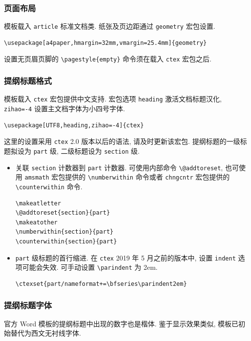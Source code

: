 \documentclass{article}
\begin{document}
\subsubsection{页面布局}

模板载入 \verb'article' 标准文档类.
纸张及页边距通过 \verb'geometry' 宏包设置.
\begin{verbatim}
\usepackage[a4paper,hmargin=32mm,vmargin=25.4mm]{geometry}
\end{verbatim}
设置无页眉页脚的 \verb'\pagestyle{empty}' 命令须在载入 \verb'ctex' 宏包之后.

\subsubsection{提纲标题格式}

模板载入 \verb'ctex' 宏包提供中文支持.
宏包选项 \verb'heading' 激活文档标题汉化, \verb'zihao=-4' 设置主文档字体为小四号字体.
\begin{verbatim}
\usepackage[UTF8,heading,zihao=-4]{ctex}
\end{verbatim}

这里的设置采用 \verb'ctex' 2.0 版本以后的语法, 请及时更新该宏包.
提纲标题的一级标题拟设为 \verb'part' 级, 二级标题设为 \verb'section' 级.
\begin{itemize}
  \item
    关联 \verb'section' 计数器到 \verb'part' 计数器.
    可使用内部命令 \verb'\@addtoreset', 也可使用 \verb'amsmath' 宏包提供的 \verb'\numberwithin' 命令或者 \verb'chngcntr' 宏包提供的 \verb'\counterwithin' 命令.
\begin{verbatim}
\makeatletter
\@addtoreset{section}{part}
\makeatother
\numberwithin{section}{part}
\counterwithin{section}{part}
\end{verbatim}
  \item
    \verb'part' 级标题的首行缩进.
    在 \verb'ctex' 2019 年 5 月之前的版本中, 设置 \verb'indent' 选项可能会失效.
    可手动设置 \verb'\parindent' 为 2em.
\begin{verbatim}
\ctexset{part/nameformat+=\bfseries\parindent2em}
\end{verbatim}
\end{itemize}

\subsubsection{提纲标题字体}

官方 Word 模板的提纲标题中出现的数字也是楷体.
鉴于显示效果类似, 模板已初始替代为西文无衬线字体.
\end{document}
